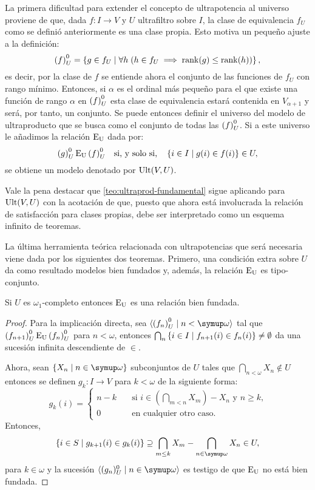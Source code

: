 La primera dificultad para extender el concepto de ultrapotencia al universo
proviene de que, dada $f\colon I\to V$ y $U$ ultrafiltro sobre $I$,
la clase de equivalencia $f_U$ como se definió anteriormente es una clase propia.
Esto motiva un pequeño ajuste a la definición:
\[
    {(f)}_U^0 = \left\{ g \in f_U\mid \forall h\; (h\in f_U\implies \operatorname{rank}(g)\leq\operatorname{rank}(h)) \right\},
\]
es decir, por la clase de $f$ se entiende ahora el conjunto de las funciones
de $f_U$ con rango mínimo. Entonces, si $\alpha$ es el ordinal más pequeño para
el que existe una función de rango $\alpha$ en ${(f)}_U^0$ esta clase de equivalencia estará
contenida en $V_{\alpha+1}$ y será, por tanto, un conjunto. Se puede entonces definir
el universo del modelo de ultraproducto que se busca como el conjunto de todas las ${(f)}_U^0$.
Si a este universo le añadimos la relación $\operatorname{E_U}$ dada por:
\[
    {(g)}_U^0 \operatorname{E_U} {(f)}_U^0
    \quad\text{si, y solo si,}\quad
    \left\{ i\in I\mid g(i)\in f(i) \right\}\in U,
\]
se obtiene un modelo
denotado por $\operatorname{Ult}(V,U)$.

Vale la pena destacar que \ref{teo:ultraprod-fundamental} sigue aplicando para
$\operatorname{Ult}(V,U)$ con la acotación de que, puesto que ahora está involucrada la relación
de satisfacción para clases propias, debe ser interpretado como un esquema infinito de teoremas.

La última herramienta teórica relacionada con ultrapotencias que será necesaria viene
dada por los siguientes dos teoremas. Primero, una condición extra sobre $U$ da como resultado
modelos bien fundados y, además, la relación $\operatorname{E_U}$ es tipo-conjunto.

\begin{teo}\label{teo:Eu-well-founded}
    Si $U$ es $\omega_1$-completo entonces $\operatorname{E_U}$ es una relación bien fundada.
\end{teo}
\begin{proof}
    Para la implicación directa, sea $\seq{\ecl{f_n}\mid n<\omega}$ tal que
    ${(f_{n+1})}_U^0\operatorname{E_U}{(f_n)}_U^0$ para $n<\omega$,
    entonces $\bigcap_n\left\{ i\in I\mid f_{n+1}(i)\in f_n(i) \right\}\neq\emptyset$
    da una sucesión infinita descendiente de $\in$.

    Ahora, sean $\set{X_n\mid n\in\omega}$ subconjuntos de $U$ tales que
    $\bigcap_{n<\omega} X_n\notin U$ entonces se definen $g_k\colon I\to V$
    para $k<\omega$ de la siguiente forma:
    \[
        g_k(i) =
        \begin{cases}
          n-k\quad & \text{si $i\in(\bigcap_{m<n} X_m) - X_n$ y $n\geq k$,}\\
          0\quad & \text{en cualquier otro caso.}
        \end{cases}
    \]
    Entonces,
    \[
        \set{i\in S\mid g_{k+1}(i)\in g_k(i)}
        \supseteq
        \bigcap_{m\leq k} X_m - \bigcap_{n\in\omega} X_n
        \in U,
    \]
    para $k\in\omega$ y la sucesión $\seq{(g_n)_U^0\mid n\in\omega}$ es testigo de que $\operatorname{E_U}$
    no está bien fundada.
\end{proof}

